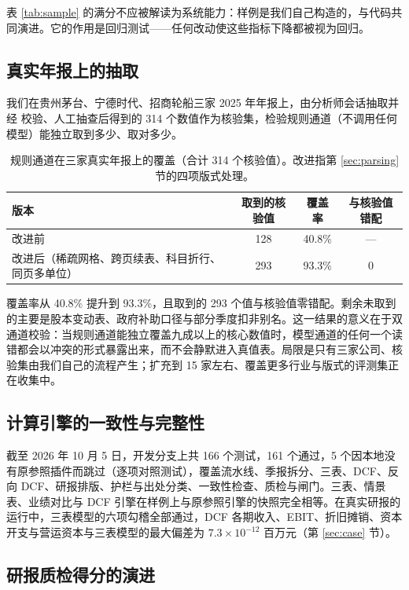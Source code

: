表 \ref{tab:sample} 的满分不应被解读为系统能力：样例是我们自己构造的，与代码共同演进。它的作用是回归测试——任何改动使这些指标下降都被视为回归。

\subsection{真实年报上的抽取}
\label{sec:exp-extract}
我们在贵州茅台、宁德时代、招商轮船三家 2025 年年报上，由分析师会话抽取并经  校验、人工抽查后得到的 314 个数值作为核验集，检验规则通道（不调用任何模型）能独立取到多少、取对多少。

\begin{table}[h]
\centering
\caption{规则通道在三家真实年报上的覆盖（合计 314 个核验值）。改进指第 \ref{sec:parsing} 节的四项版式处理。}
\label{tab:extract}
\small
\begin{tabular}{@{}lccc@{}}
\toprule
版本 & 取到的核验值 & 覆盖率 & 与核验值错配 \\
\midrule
改进前 & 128 & 40.8\% & — \\
改进后（稀疏网格、跨页续表、科目折行、同页多单位） & 293 & 93.3\% & 0 \\
\bottomrule
\end{tabular}
\end{table}

覆盖率从 40.8\% 提升到 93.3\%，且取到的 293 个值与核验值零错配。剩余未取到的主要是股本变动表、政府补助口径与部分季度扣非别名。这一结果的意义在于双通道校验：当规则通道能独立覆盖九成以上的核心数值时，模型通道的任何一个读错都会以冲突的形式暴露出来，而不会静默进入真值表。局限是只有三家公司、核验集由我们自己的流程产生；扩充到 15 家左右、覆盖更多行业与版式的评测集正在收集中。

\subsection{计算引擎的一致性与完整性}
截至 2026 年 10 月 5 日，开发分支上共 166 个测试，161 个通过，5 个因本地没有原参照插件而跳过（逐项对照测试），覆盖流水线、季报拆分、三表、DCF、反向 DCF、研报排版、护栏与出处分类、一致性检查、质检与闸门。三表、情景表、业绩对比与 DCF 引擎在样例上与原参照引擎的快照完全相等。在真实研报的运行中，三表模型的六项勾稽全部通过，DCF 各期收入、EBIT、折旧摊销、资本开支与营运资本与三表模型的最大偏差为 $7.3\times10^{-12}$ 百万元（第 \ref{sec:case} 节）。

\subsection{研报质检得分的演进}
\label{sec:exp-quality}

